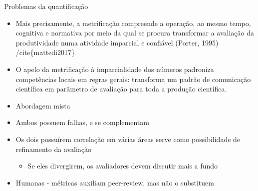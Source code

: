 \documentclass[bigger]{beamer}
\begin{document}
\begin{frame}[label={sec:orge1bd217}]{Problemas da quantificação}
\begin{itemize}
\item Mais precisamente, a metrificação compreende a operação, ao mesmo tempo, cognitiva e normativa por meio da qual se procura transformar a avaliação da produtividade numa atividade imparcial e confiável (Porter, 1995) /cite\{mattedi2017\}
\item O apelo da metrificação à imparcialidade dos números padroniza competências locais em regras gerais: transforma um padrão de comunicação científica em parâmetro de avaliação para toda a produção científica.
\end{itemize}
\end{frame}



\begin{frame}[label={sec:orga3aa205}]{\cite{butler2007}}
\begin{itemize}
\item Abordagem mista
\item Ambos possuem falhas, e se complementam
\item Os dois possuírem correlação em várias áreas serve como possibilidade de refinamento da avaliação
\begin{itemize}
\item Se eles divergirem, os avaliadores devem discutir mais a fundo
\end{itemize}

\item Humanas - métricas auxiliam peer-review, mas não o substituem \parencite{abramo2011}
\end{itemize}
\end{frame}
\end{document}
